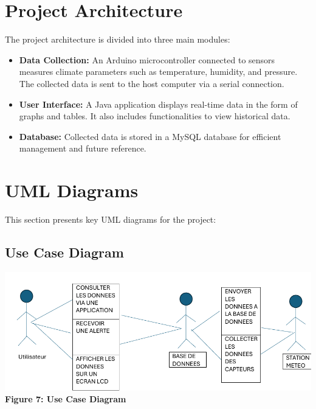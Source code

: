 \documentclass[a4paper,12pt]{article}
\begin{document}
	\section{Project Architecture}
	The project architecture is divided into three main modules:
	\begin{itemize}
		\item \textbf{Data Collection:} An Arduino microcontroller connected to sensors measures climate parameters such as temperature, humidity, and pressure. The collected data is sent to the host computer via a serial connection.
		\item \textbf{User Interface:} A Java application displays real-time data in the form of graphs and tables. It also includes functionalities to view historical data.
		\item \textbf{Database:} Collected data is stored in a MySQL database for efficient management and future reference.
	\end{itemize}
	
	\section{UML Diagrams}
	This section presents key UML diagrams for the project:
	
	\subsection{Use Case Diagram}
	\begin{center}
		\includegraphics[width=\textwidth]{diagdecas.png}\\
		\textbf{Figure 7: Use Case Diagram}
	\end{center}
	
\end{document}
